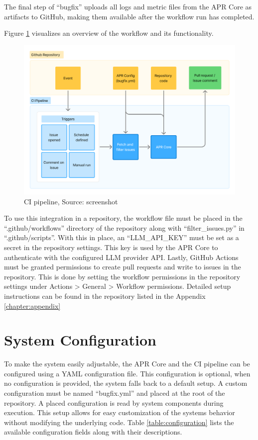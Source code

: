 The final step of ``bugfix'' uploads all logs and metric files from the APR Core as artifacts to GitHub, making them available after the workflow run has completed.

Figure \ref{fig:ci} visualizes an overview of the workflow and its functionality.

\begin{figure}[H]
    \centering
    \includegraphics[width=1\textwidth]{images/flowcharts/ci.png}
    \caption{CI pipeline, Source: screenshot}
    \label{fig:ci}
\end{figure}

To use this integration in a repository, the workflow file must be placed in the ``.github/workflows'' directory of the repository along with ``filter\_issues.py'' in ``.github/scripts''. With this in place, an ``LLM\_API\_KEY'' must be set as a secret in the repository settings. This key is used by the APR Core to authenticate with the configured \ac{LLM} provider API. Lastly, GitHub Actions must be granted permissions to create pull requests and write to issues in the repository. This is done by setting the workflow permissions in the repository settings under Actions > General > Workflow permissions. Detailed setup instructions can be found in the repository listed in the Appendix \ref{chapter:appendix}

\section{System Configuration}
To make the system easily adjustable, the APR Core and the \ac{CI} pipeline can be configured using a YAML configuration file. This configuration is optional, when no configuration is provided, the system falls back to a default setup. A custom configuration must be named ``bugfix.yml'' and placed at the root of the repository. A placed configuration is read by system components during execution. This setup allows for easy customization of the systems behavior without modifying the underlying code. Table \ref{table:configuration} lists the available configuration fields along with their descriptions.

